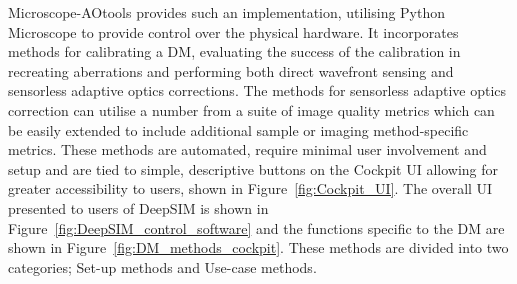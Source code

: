 Microscope-AOtools provides such an implementation, utilising Python Microscope to provide control over the physical hardware. It incorporates methods for calibrating a DM, evaluating the success of the calibration in recreating aberrations and performing both direct wavefront sensing and sensorless adaptive optics corrections. The methods for sensorless adaptive optics correction can utilise a number from a suite of image quality metrics which can be easily extended to include additional sample or imaging method-specific metrics. These methods are automated, require minimal user involvement and setup and are tied to simple, descriptive  buttons on the Cockpit UI allowing for greater accessibility to users, shown in Figure~\ref{fig:Cockpit_UI}. The overall UI presented to users of DeepSIM is shown in Figure~\ref{fig:DeepSIM_control_software} and the functions specific to the DM are shown in Figure~\ref{fig:DM_methods_cockpit}. These methods are divided into two categories; Set-up methods and Use-case methods.

